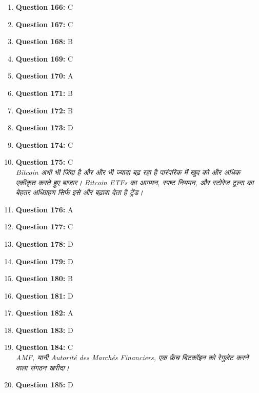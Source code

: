\documentclass[12pt,a4paper]{article}
\begin{document}
\begin{enumerate}
\item \textbf{Question 166:} C

\item \textbf{Question 167:} C

\item \textbf{Question 168:} B

\item \textbf{Question 169:} C

\item \textbf{Question 170:} A

\item \textbf{Question 171:} B

\item \textbf{Question 172:} B

\item \textbf{Question 173:} D

\item \textbf{Question 174:} C

\item \textbf{Question 175:} C
\\ \textit{Bitcoin अभी भी जिंदा है और और भी ज्यादा बढ़ रहा है पारंपरिक में खुद को और अधिक एकीकृत करते हुए बाजार। Bitcoin ETFs का आगमन, स्पष्ट नियमन, और स्टोरेज टूल्स का बेहतर अधिग्रहण सिर्फ इसे और बढ़ावा देता है ट्रेंड।}

\item \textbf{Question 176:} A

\item \textbf{Question 177:} C

\item \textbf{Question 178:} D

\item \textbf{Question 179:} D

\item \textbf{Question 180:} B

\item \textbf{Question 181:} D

\item \textbf{Question 182:} A

\item \textbf{Question 183:} D

\item \textbf{Question 184:} C
\\ \textit{AMF, यानी Autorité des Marchés Financiers, एक फ्रेंच बिटकॉइन को रेगुलेट करने वाला संगठन खरीदा।}

\item \textbf{Question 185:} D


\end{enumerate}
\end{document}
